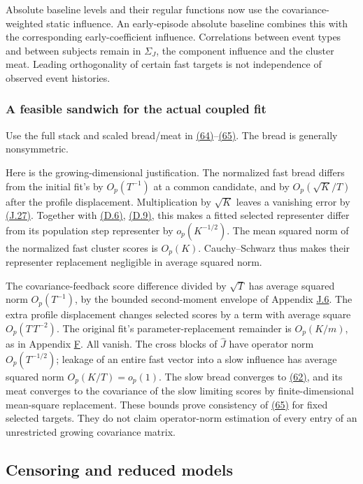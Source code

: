 \documentclass[11pt]{article}
\begin{document}
Absolute baseline levels and their regular functions now use the covariance-weighted static influence. An early-episode absolute baseline combines this with the corresponding early-coefficient influence. Correlations between event types and between subjects remain in \(\Sigma_J\), the component influence and the cluster meat. Leading orthogonality of certain fast targets is not independence of observed event histories.

\subsubsection{A feasible sandwich for the actual coupled fit}\label{sec:J.7.3}

Use the full stack and scaled bread/meat in \hyperref[eq:64]{(64)}--\hyperref[eq:65]{(65)}. The bread is generally nonsymmetric.

Here is the growing-dimensional justification. The normalized fast bread differs from the initial fit's by \(O_p(T^{-1})\) at a common candidate, and by \(O_p(\sqrt K/T)\) after the profile displacement. Multiplication by \(\sqrt K\) leaves a vanishing error by \hyperref[eq:J.27]{(J.27)}. Together with \hyperref[eq:D.6]{(D.6)}, \hyperref[eq:D.9]{(D.9)}, this makes a fitted selected representer differ from its population step representer by \(o_p(K^{-1/2})\). The mean squared norm of the normalized fast cluster scores is \(O_p(K)\). Cauchy--Schwarz thus makes their representer replacement negligible in average squared norm.

The covariance-feedback score difference divided by \(\sqrt T\) has average squared norm \(O_p(T^{-1})\), by the bounded second-moment envelope of Appendix \hyperref[sec:J.6]{J.6}. The extra profile displacement changes selected scores by a term with average square \(O_p(T\,T^{-2})\). The original fit's parameter-replacement remainder is \(O_p(K/m)\), as in Appendix \hyperref[sec:F]{F}. All vanish. The cross blocks of \(\widehat J\) have operator norm \(O_p(T^{-1/2})\); leakage of an entire fast vector into a slow influence has average squared norm \(O_p(K/T)=o_p(1)\). The slow bread converges to \hyperref[eq:62]{(62)}, and its meat converges to the covariance of the slow limiting scores by finite-dimensional mean-square replacement. These bounds prove consistency of \hyperref[eq:65]{(65)} for fixed selected targets. They do not claim operator-norm estimation of every entry of an unrestricted growing covariance matrix.

\subsection{Censoring and reduced models}\label{sec:J.8}
\end{document}
